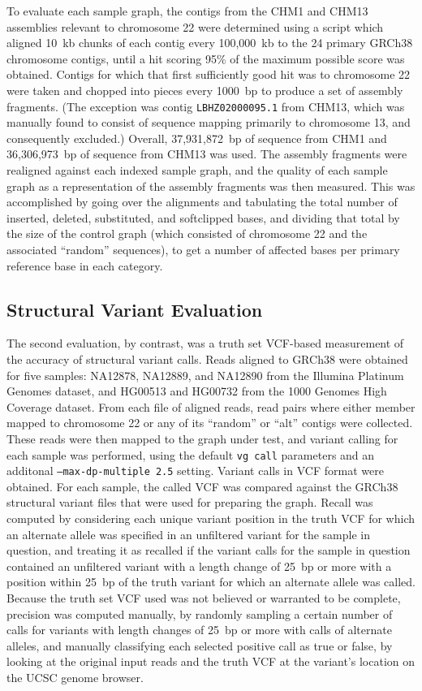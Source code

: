 To evaluate each sample graph, the contigs from the CHM1 and CHM13 assemblies relevant to chromosome 22 were determined using a script which aligned 10~kb chunks of each contig every 100,000~kb to the 24 primary GRCh38 chromosome contigs, until a hit scoring 95\% of the maximum possible score was obtained. Contigs for which that first sufficiently good hit was to chromosome 22 were taken and chopped into pieces every 1000~bp to produce a set of assembly fragments. (The exception was contig \texttt{LBHZ02000095.1} from CHM13, which was manually found to consist of sequence mapping primarily to chromosome 13, and consequently excluded.) Overall, 37,931,872~bp of sequence from CHM1 and 36,306,973~bp of sequence from CHM13 was used. The assembly fragments were realigned against each indexed sample graph, and the quality of each sample graph as a representation of the assembly fragments was then measured. This was accomplished by going over the alignments and tabulating the total number of inserted, deleted, substituted, and softclipped bases, and dividing that total by the size of the control graph (which consisted of chromosome 22 and the associated ``random'' sequences), to get a number of affected bases per primary reference base in each category.

\subsection{Structural Variant Evaluation}

The second evaluation, by contrast, was a truth set VCF-based measurement of the accuracy of structural variant calls. Reads aligned to GRCh38 were obtained for five samples: NA12878, NA12889, and NA12890 from the Illumina Platinum Genomes dataset, and HG00513 and HG00732 from the 1000 Genomes High Coverage dataset. From each file of aligned reads, read pairs where either member mapped to chromosome 22 or any of its ``random'' or ``alt'' contigs were collected. These reads were then mapped to the graph under test, and variant calling for each sample was performed, using the default \texttt{vg call} parameters and an additonal \texttt{--max-dp-multiple 2.5} setting. Variant calls in VCF format were obtained. For each sample, the called VCF was compared against the GRCh38 structural variant files that were used for preparing the graph. Recall was computed by considering each unique variant position in the truth VCF for which an alternate allele was specified in an unfiltered variant for the sample in question, and treating it as recalled if the variant calls for the sample in question contained an unfiltered variant with a length change of 25~bp or more with a position within 25~bp of the truth variant for which an alternate allele was called. Because the truth set VCF used was not believed or warranted to be complete, precision was computed manually, by randomly sampling a certain number of calls for variants with length changes of 25~bp or more with calls of alternate alleles, and manually classifying each selected positive call as true or false, by looking at the original input reads and the truth VCF at the variant's location on the UCSC genome browser.

